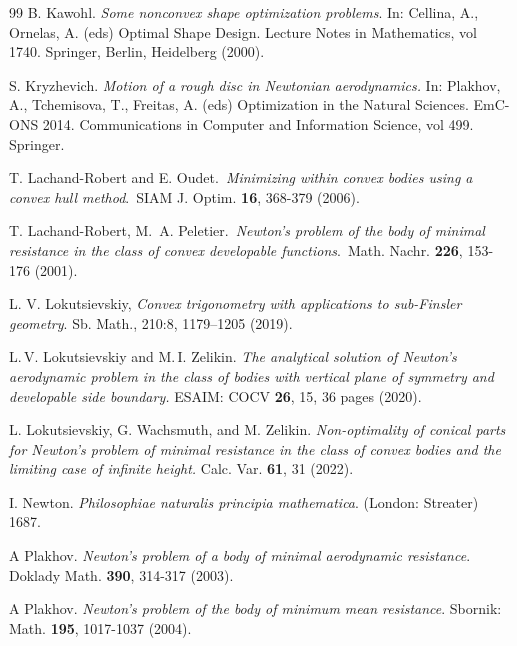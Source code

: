 \documentclass[a4paper,12pt]{article}
\theoremstyle{remark}
\theoremstyle{definition}
\begin{document}
\begin{thebibliography}{99}
B. Kawohl.  {\it Some nonconvex shape optimization problems}. In: Cellina, A., Ornelas, A. (eds) Optimal Shape Design. Lecture Notes in Mathematics, vol 1740. Springer, Berlin, Heidelberg (2000).  %

S. Kryzhevich. {\it Motion of a rough disc in Newtonian aerodynamics.} In: Plakhov, A., Tchemisova, T., Freitas, A. (eds) Optimization in the Natural Sciences. EmC-ONS 2014. Communications in Computer and Information Science, vol 499. Springer. %


T. Lachand-Robert and E. Oudet.\, \textit{Minimizing within convex bodies using a convex hull method}.\, SIAM J. Optim. {\bf 16}, 368-379 (2006).

T. Lachand-Robert, M.~A. Peletier.\,
\textit{Newton's problem of the body of minimal resistance in the class of convex developable functions}.\, Math. Nachr. {\bf 226}, 153-176 (2001).


  L. V. Lokutsievskiy, {\it Convex trigonometry with applications to sub-Finsler geometry}. Sb. Math., 210:8, 1179–1205 (2019).

L.\,V. Lokutsievskiy and M.\,I. Zelikin. {\it
The analytical solution of Newton’s aerodynamic problem in the class of bodies with vertical plane of symmetry and developable side boundary.}
ESAIM: COCV {\bf 26}, 15, 36 pages (2020).

L. Lokutsievskiy, G. Wachsmuth, and M. Zelikin. {\it
Non-optimality of conical parts for Newton’s problem of minimal resistance in the class of convex bodies and the limiting case of infinite height.} Calc. Var. {\bf 61}, 31 (2022).

I. Newton. {\it Philosophiae naturalis principia mathematica}. (London: Streater) 1687.

A Plakhov. {\it Newton's problem of a body of minimal aerodynamic resistance}. Doklady Math. {\bf 390}, 314-317 (2003).

A Plakhov. {\it Newton's problem of the body of minimum mean resistance}. Sbornik: Math. {\bf 195}, 1017-1037 (2004).


\end{thebibliography}
\end{document}
